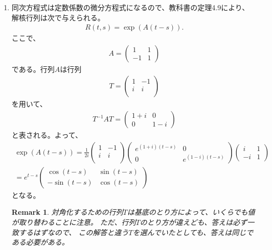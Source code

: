 \documentclass[fleqn]{jsarticle}
\newtheorem{remark}{Remark}
\begin{document}
\begin{enumerate}
\item 同次方程式は定数係数の微分方程式になるので、教科書の定理4.9により、
解核行列は次で与えられる。
\begin{eqnarray}
R(t,s)=\exp(A(t-s)).
\end{eqnarray}
ここで、
\begin{eqnarray}
A=\left(
\begin{array}{cc}
1 & 1\\
-1 & 1
\end{array}
\right)
\end{eqnarray}
である。行列$A$は行列
\begin{eqnarray}
T=\left(
\begin{array}{cc}
1 & -1\\
i & i\\
\end{array}
\right)
\end{eqnarray}
を用いて、
\begin{eqnarray}
T^{-1}AT=\left(
\begin{array}{cc}
1+i & 0\\
0 & 1-i
\end{array}
\right)
\end{eqnarray}
と表される。よって、
\begin{eqnarray}
\exp(A(t-s))=
\frac{1}{2i}\left(
\begin{array}{cc}
1 & -1\\
i & i\\
\end{array}
\right)\left(
\begin{array}{cc}
e^{(1+i)(t-s)} & 0\\
0 & e^{(1-i)(t-s)}
\end{array}
\right)\left(
\begin{array}{cc}
i & 1\\
-i & 1
\end{array}
\right)\\
=e^{t-s}\left(
\begin{array}{cc}
\cos(t-s) & \sin(t-s)\\
-\sin(t-s) & \cos(t-s)
\end{array}
\right)
\end{eqnarray}
となる。
\begin{remark}
対角化するための行列$T$は基底のとり方によって、いくらでも値が取り替わることに注意。
ただ、行列$T$のとり方が違えども、答えは必ず一致するはずなので、
この解答と違う$T$を選んでいたとしても、答えは同じである必要がある。
\end{remark}


\end{enumerate}
\end{document}
